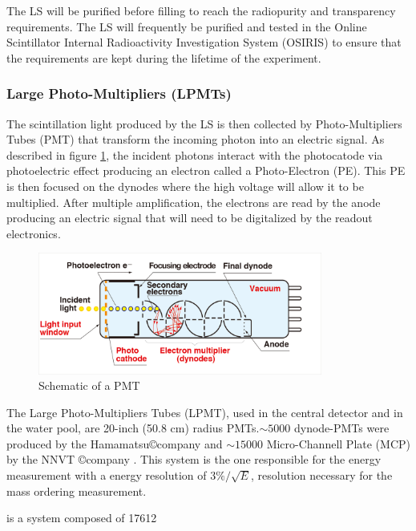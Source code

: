 The LS will be purified before filling to reach the radiopurity and transparency requirements. The LS will frequently be purified and tested in the Online Scintillator Internal Radioactivity Investigation System (OSIRIS) \cite{juno_collaboration_design_2021} to ensure that the requirements are kept during the lifetime of the experiment.

\subsubsection{Large Photo-Multipliers (LPMTs)}
\label{sec:LPMT}

The scintillation light produced by the LS is then collected by Photo-Multipliers Tubes (PMT) that transform the incoming photon into an electric signal. As described in figure \ref{fig:pmt-schem}, the incident photons interact with the photocatode via photoelectric effect producing an electron called a Photo-Electron (PE). This PE is then focused on the dynodes where the high voltage will allow it to be multiplied. After multiple amplification, the electrons are read by the anode producing an electric signal that will need to be digitalized by the readout electronics.

\begin{figure}[ht]
  \centering
  \includegraphics[height=4cm]{images/juno/pmt_schematic.png}
  \caption{Schematic of a PMT}
  \label{fig:pmt-schem}
\end{figure}

The Large Photo-Multipliers Tubes (LPMT), used in the central detector and in the water pool, are 20-inch (50.8 cm) radius PMTs.$\sim 5000$ dynode-PMTs \cite{noauthor_photomultiplier_nodate} were produced by the Hamamatsu\copyright company and $\sim 15000$ Micro-Channell Plate (MCP) \cite{abusleme_mass_2022} by the NNVT \copyright company . This system is the one responsible for the energy measurement with a energy resolution of $3\%/\sqrt{E}$, resolution necessary for the mass ordering measurement. 


is a system composed of 17612 


